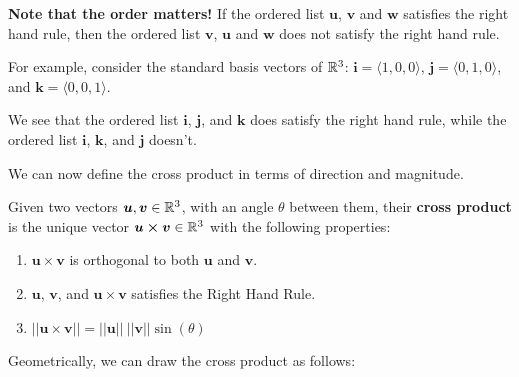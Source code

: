 \textbf{Note that the order matters!} If the ordered list $\bm{u}$, $\bm{v}$ and $\bm{w}$ satisfies the right hand rule, then the ordered list $\bm{v}$, $\bm{u}$ and $\bm{w}$ does not satisfy the right hand rule.

\begin{example}
    For example, consider the standard basis vectors of $\mathbb{R}^3$:  $\bm{i} = \langle 1, 0 , 0 \rangle$, $\bm{j}= \langle 0,1 , 0 \rangle$, and $\bm{k}= \langle 0 , 0,1 \rangle$.

    We see that the ordered list $\bm{i}$, $\bm{j}$, and $\bm{k}$ does satisfy the right hand rule, while the ordered list $\bm{i}$, $\bm{k}$, and $\bm{j}$ doesn't.
\end{example}


We can now define the cross product in terms of direction and magnitude.

\begin{definition}\label{crossproddirmag}
    Given two vectors $\bm{u}, \bm{v} \in \mathbb{R}^3$, with an angle $\theta$ between them, their \textbf{cross product} is the \textnormal{unique} vector $\bm{u \times v} \in \mathbb{R}^3$ with the following properties:
    \begin{enumerate}[label=(\roman*)]
        \item $\bm{u \times v}$ is orthogonal to both $\bm{u}$ and $\bm{v}$.
        \item $\bm{u}$, $\bm{v}$, and $\bm{u \times v}$ satisfies the Right Hand Rule. 
        \item $||\bm{u \times v}|| = ||\bm{u}|| \ ||\bm{v}|| \sin(\theta)$
    \end{enumerate}
    
    Geometrically, we can draw the cross product as follows:
    
    \begin{center}
    \end{center}
    
    \end{definition}



